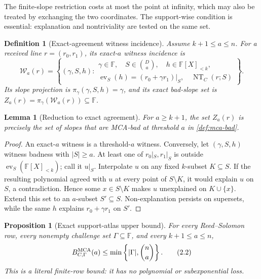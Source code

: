 \documentclass[11pt,a4paper]{amsart}
\numberwithin{equation}{section}
\newtheorem{proposition}[proposition]{Proposition}
\newtheorem{lemma}[lemma]{Lemma}
\newtheorem{definition}[definition]{Definition}
\theoremstyle{remark}
\newcommand{\F}{\mathbb F}
\newcommand{\Wcal}{\mathcal W}
\newcommand{\abs}[1]{\lvert #1\rvert}
\begin{document}
The finite-slope restriction costs at most the point at infinity, which may
also be treated by exchanging the two coordinates.  The support-wise
condition is essential: explanation and nontriviality are tested on the
same set.

\begin{definition}[Exact-agreement witness incidence]
\label{def:exact-witness-incidence}
Assume \(k+1\le a\le n\).  For a received line \(r=(r_0,r_1)\), its
exact-\(a\) witness incidence is
\[
 \Wcal_a(r)=\left\{(\gamma,S,h):
 \begin{array}{l}
   \gamma\in\F,\quad S\in\binom Da,\quad h\in\F[X]_{<k},\\
   \operatorname{ev}_S(h)=(r_0+\gamma r_1)|_S,\quad
   \operatorname{NT}_C(r;S)
 \end{array}\right\}.
 \tag{2.1}\label{eq:exact-witness-incidence}
\]
Its slope projection is
\(\pi_\gamma(\gamma,S,h)=\gamma\), and its exact bad-slope set is
\(Z_a(r)=\pi_\gamma(\Wcal_a(r))\subseteq\F\).
\end{definition}

\begin{lemma}[Reduction to exact agreement]
\label{lem:exact-agreement-reduction}
For \(a\ge k+1\), the set \(Z_a(r)\) is precisely the set of slopes that
are MCA-bad at threshold \(a\) in \cref{def:mca-bad}.
\end{lemma}

\begin{proof}
An exact-\(a\) witness is a threshold-\(a\) witness.  Conversely, let
\((\gamma,S,h)\) witness badness with \(\abs S\ge a\).  At least one of
\(r_0|_S,r_1|_S\) is outside
\(\operatorname{ev}_S(\F[X]_{<k})\); call it \(u|_S\).  Interpolate \(u\)
on any fixed \(k\)-subset \(K\subseteq S\).  If the resulting polynomial
agreed with \(u\) at every point of \(S\setminus K\), it would explain
\(u\) on \(S\), a contradiction.  Hence some \(x\in S\setminus K\)
makes \(u\) unexplained on \(K\cup\{x\}\).  Extend this set to an
\(a\)-subset \(S'\subseteq S\).  Non-explanation persists on supersets,
while the same \(h\) explains \(r_0+\gamma r_1\) on \(S'\).
\end{proof}

\begin{proposition}[Exact support-atlas upper bound]
\label{prop:exact-support-upper}
For every Reed--Solomon row, every nonempty challenge set
\(\Gamma\subseteq\F\), and every \(k+1\le a\le n\),
\[
 B_{C,\Gamma}^{\rm MCA}(a)
 \le\min\left\{\abs\Gamma,\binom na\right\}.        \tag{2.2}
\]
This is a literal finite-row bound: it has no polynomial or
subexponential loss.
\end{proposition}
\end{document}
